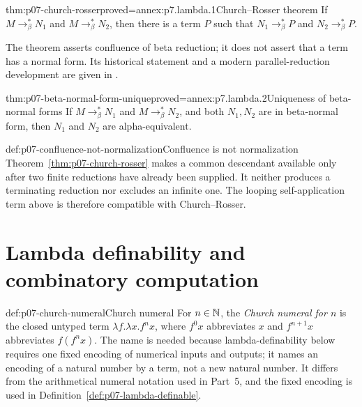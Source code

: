 \begin{hbtheorem}{thm:p07-church-rosser}{proved=annex:p7.lambda.1}{Church--Rosser theorem}
If
\(M\longrightarrow_{\beta}^{*}N_1\) and
\(M\longrightarrow_{\beta}^{*}N_2\), then there is a term \(P\) such that
\(N_1\longrightarrow_{\beta}^{*}P\) and
\(N_2\longrightarrow_{\beta}^{*}P\).
\end{hbtheorem}

The theorem asserts confluence of beta reduction; it does not assert that a
term has a normal form.  Its historical statement and a modern
parallel-reduction development are given in
\cite{ChurchRosser1936,GirardLafontTaylor1989}.

\begin{hbcorollary}{thm:p07-beta-normal-form-unique}{proved=annex:p7.lambda.2}{Uniqueness of beta-normal forms}
If \(M\longrightarrow_{\beta}^{*}N_1\) and
\(M\longrightarrow_{\beta}^{*}N_2\), and both \(N_1,N_2\) are in beta-normal
form, then \(N_1\) and \(N_2\) are alpha-equivalent.
\end{hbcorollary}

\begin{hbwarning}{def:p07-confluence-not-normalization}{Confluence is not normalization}
Theorem~\ref{thm:p07-church-rosser} makes a common descendant available only
after two finite reductions have already been supplied.  It neither produces
a terminating reduction nor excludes an infinite one.  The looping
self-application term above is therefore compatible with Church--Rosser.
\end{hbwarning}

\section[Lambda definability]{Lambda definability and combinatory computation}

\begin{hbdefinition}{def:p07-church-numeral}{Church numeral}
For \(n\in\mathbb{N}\), the \emph{Church numeral for \(n\)} is the closed untyped term
\(\lambda f.\lambda x.f^n x\), where \(f^0x\) abbreviates \(x\) and
\(f^{n+1}x\) abbreviates \(f(f^nx)\).  The name is needed because
lambda-definability below requires one fixed encoding of numerical inputs and
outputs; it names an encoding of a natural number by a term, not a new natural
number.  It differs from the arithmetical numeral notation used in Part~5,
and the fixed encoding is used in Definition~\ref{def:p07-lambda-definable}.
\end{hbdefinition}

